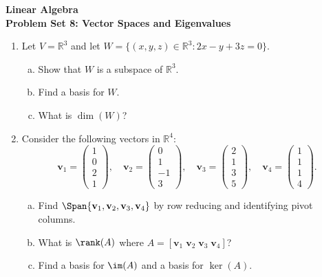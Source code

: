 \documentclass[11pt]{article}
\newcommand{\R}{\mathbb{R}}
\begin{document}
\begin{center}
  {\large\textbf{Linear Algebra}} \\[4pt]
  \textbf{Problem Set 8: Vector Spaces and Eigenvalues}
\end{center}

\bigskip

\begin{enumerate}

\item Let $V = \R^3$ and let $W = \{(x, y, z) \in \R^3 : 2x - y + 3z = 0\}$.
\begin{enumerate}[(a)]
  \item Show that $W$ is a subspace of $\R^3$.
  \item Find a basis for $W$.
  \item What is $\dim(W)$?
\end{enumerate}

\item Consider the following vectors in $\R^4$:
\[
  \mathbf{v}_1 = \begin{pmatrix} 1 \\ 0 \\ 2 \\ 1 \end{pmatrix}, \quad
  \mathbf{v}_2 = \begin{pmatrix} 0 \\ 1 \\ -1 \\ 3 \end{pmatrix}, \quad
  \mathbf{v}_3 = \begin{pmatrix} 2 \\ 1 \\ 3 \\ 5 \end{pmatrix}, \quad
  \mathbf{v}_4 = \begin{pmatrix} 1 \\ 1 \\ 1 \\ 4 \end{pmatrix}.
\]
\begin{enumerate}[(a)]
  \item Find $\Span\{\mathbf{v}_1, \mathbf{v}_2, \mathbf{v}_3, \mathbf{v}_4\}$ by row reducing and identifying pivot columns.
  \item What is $\rank(A)$ where $A = [\mathbf{v}_1 \; \mathbf{v}_2 \; \mathbf{v}_3 \; \mathbf{v}_4]$?
  \item Find a basis for $\im(A)$ and a basis for $\ker(A)$.
\end{enumerate}


\end{enumerate}
\end{document}
